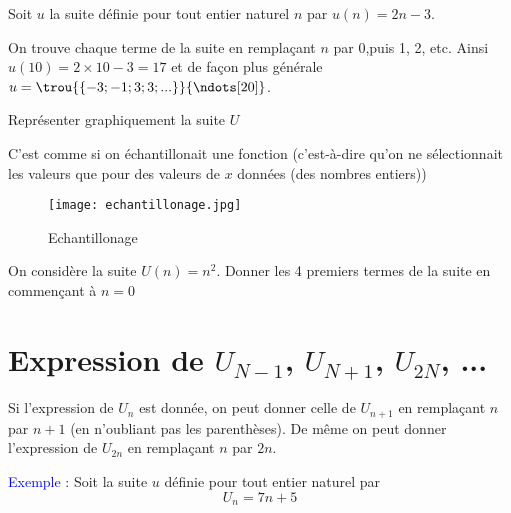 \documentclass[a4paper,12pt]{article}
\begin{document}
\begin{tcolorbox}[colback=blue!10!white, colframe=blue!75!black, title=Exercices]
  Soit $u$ la suite définie pour tout entier naturel $n$ par $u(n) = 2n - 3$. \par 
  On trouve chaque terme de la suite en remplaçant $n$ par 0,puis 1, 2, etc.
  Ainsi $u(10) = 2 \times 10 - 3 = 17$ et de façon plus générale $u = { \trou{\{-3 ; -1 ; 3; 3 ; ...\}}{\ndots[20]}}$. \par
  \vspace{1em}
  Représenter graphiquement la suite $U$
  \vspace{6em}
\end{tcolorbox}

C'est comme si on échantillonait une fonction (c'est-à-dire qu'on ne sélectionnait les valeurs que pour des valeurs de $x$ données (des nombres entiers))

\begin{figure}[H]
  \centering
  \texttt{[image: echantillonage.jpg]}
  \caption{\label{} Echantillonage}
\end{figure}

\begin{tcolorbox}[colback=blue!10!white, colframe=blue!75!black, title=Exercices]
  On considère la suite $U(n) = n^2$. Donner les 4 premiers termes de la suite en commençant à $n = 0$

  \trou{
    \[
    \left\{
      \begin{array}{ll}
            U(0) = 0 \\
            U(1) = 1^2 = 1 \\
            U(2) = 2^2 = 4 \\
            U(3) = 3^2 = 9 \\
        \end{array}
      \right.
    \]
  }{\vspace{5em}}

\end{tcolorbox}

\section*{Expression de $U_{N-1}$, $U_{N+1}$, $U_{2N}$, ...}

Si l’expression de $U_n$ est donnée, on peut donner celle de $U_{n+1}$ en remplaçant $n$ par $n + 1$ (en n'oubliant pas les parenthèses).
De même on peut donner l’expression de $U_{2n}$ en remplaçant $n$ par $2n$. \par
\vspace{1em}
\textcolor{blue}{Exemple} : Soit la suite $u$ définie pour tout entier naturel par
\[
  U_n = 7n + 5
\] \par
\end{document}
